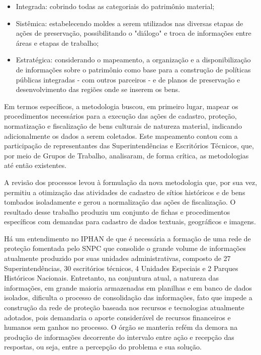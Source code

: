 \begin{itemize}
\item Integrada: cobrindo todas as categoriais do patrimônio material;
\item Sistêmica: estabelecendo moldes a serem utilizados nas diversas etapas de ações de preservação, possibilitando o "diálogo" e troca de informações entre áreas e etapas de trabalho;
\item Estratégica: considerando o mapeamento, a organização e a disponibilização de informações sobre o patrimônio como base para a construção de políticas públicas integradas - com outros parceiros - e de planos de preservação e desenvolvimento das regiões onde se inserem os bens.
\end{itemize}

Em termos específicos, a metodologia buscou, em primeiro lugar, mapear os procedimentos necessários para a execução das ações de cadastro, proteção, normatização e fiscalização de bens culturais de natureza material, indicando adicionalmente os dados a serem coletados. Este mapeamento contou com a participação de representantes das Superintendências e Escritórios Técnicos, que, por meio de Grupos de Trabalho, analisaram, de forma crítica, as metodologias até então existentes.

A revisão dos processos levou à formulação da nova metodologia que, por sua vez, permitiu a otimização das atividades de cadastro de sítios históricos e de bens tombados isoladamente e gerou a normalização das ações de fiscalização. O resultado desse trabalho produziu um conjunto de fichas e procedimentos específicos com demandas para cadastro de dados textuais, geográficos e imagens.

Há um entendimento no IPHAN de que é necessária a formação de uma rede de proteção fomentada pelo SNPC que consolide o grande volume de informações atualmente produzido por suas unidades administrativas, composto de 27 Superintendências, 30 escritórios técnicos, 4 Unidades Especiais e 2 Parques Históricos Nacionais. Entretanto, na conjuntura atual, a natureza das informações, em grande maioria armazenadas em planilhas e em banco de dados isolados, dificulta o processo de consolidação das informações, fato 
que impede a construção da rede de proteção baseada nos recursos e tecnologias atualmente adotados, pois demandaria o aporte considerável de recursos financeiros e humanos sem ganhos no processo. O órgão se manteria refém da demora na produção de informações decorrente do intervalo entre ação e recepção das respostas, ou seja, entre a percepção do problema e sua solução.

